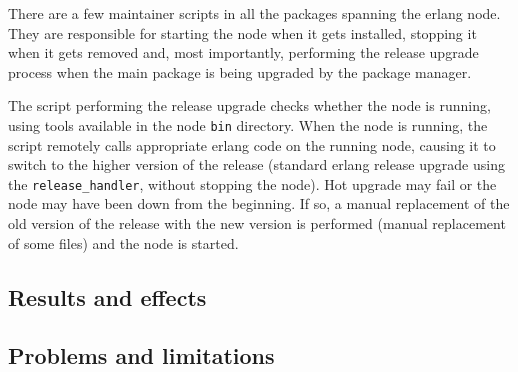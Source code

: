 There are a few maintainer scripts in all the packages spanning the erlang node.
They are responsible for starting the node when it gets installed, stopping it when it gets
removed and, most importantly, performing the release upgrade process when the main package is being
upgraded by the package manager.

The script performing the release upgrade checks whether the node is running, using tools available in the node {\tt bin} directory.
When the node is running, the script remotely calls appropriate erlang code on the running node, causing it to switch to the higher
version of the release (standard erlang release upgrade using the {\tt release\_handler}, without stopping the node).
Hot upgrade may fail or the node may have been down from the beginning. If so, a manual replacement of the old version of the release with the new version is performed (manual replacement of some files) and the node is started.

\subsection{Results and effects} 
\subsection{Problems and limitations}
